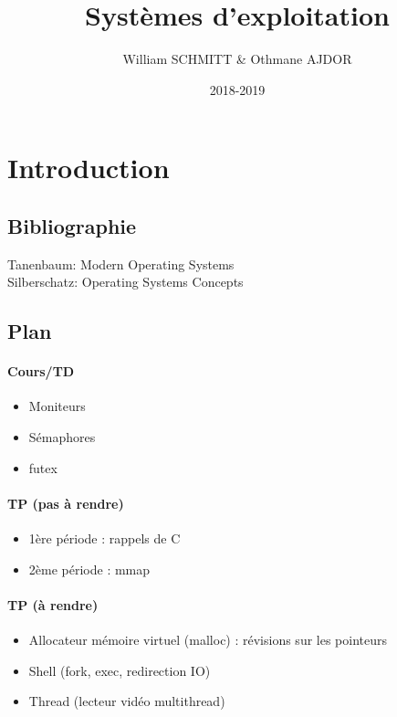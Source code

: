 \documentclass[11pt]{article}
\title{Systèmes d'exploitation}
\author{William SCHMITT \& Othmane AJDOR}
\date{2018-2019}
\begin{document}
\maketitle

\section{Introduction}
\subsection{Bibliographie}

Tanenbaum: Modern Operating Systems \\
Silberschatz: Operating Systems Concepts

\subsection{Plan}

\paragraph{Cours/TD}
\begin{itemize}
	\item Moniteurs
	\item Sémaphores
	\item futex
\end{itemize}

\paragraph{TP (pas à rendre)}
\begin{itemize}
	\item 1ère période : rappels de C
	\item 2ème période : mmap
\end{itemize}

\paragraph{TP (à rendre)}
\begin{itemize}
	\item Allocateur mémoire virtuel (malloc) : révisions sur les pointeurs
	\item Shell (fork, exec, redirection IO)
	\item Thread (lecteur vidéo multithread)
\end{itemize}
\end{document}
